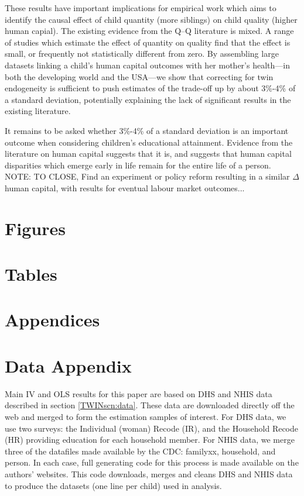 \documentclass[subeqn]{article}
\begin{document}
\begin{spacing}{1.4}
These results have important implications for empirical work which aims to 
identify the causal effect of child quantity (more siblings) on child quality
(higher human capial).  The existing evidence from the Q--Q literature is 
mixed.  A range of studies which estimate the effect of quantity on quality
find that the effect is small, or frequently not statistically different from
zero.  By assembling large datasets linking a child's human capital outcomes
with her mother's health---in both the developing world and the USA---we show
that correcting for twin endogeneity is sufficient to push estimates of the
trade-off up by about 3\%-4\% of a standard deviation, potentially explaining 
the lack of significant results in the existing literature.

It remains to be asked whether 3\%-4\% of a standard deviation is an 
important outcome when considering children's educational attainment. Evidence 
from the literature on human capital suggests that it is, and suggests that 
human capital disparities which emerge early in life remain for the entire
life of a person.  NOTE: TO CLOSE, Find an experiment or policy reform 
resulting in a similar $\Delta$ human capital, with results for eventual
labour market outcomes...


\newpage
\section*{Figures}


\clearpage
\section*{Tables}

\clearpage




\newpage
\appendix
\section*{Appendices}
\section{Data Appendix}
\label{TWINscn:dataApp}
Main IV and OLS results for this paper are based on DHS and NHIS data described 
in section \ref{TWINscn:data}.  These data are downloaded directly off the web 
and merged to form the estimation samples of interest. For DHS data, we use two 
surveys: the Individual (woman) Recode (IR), and the Household Recode (HR) 
providing education for each household member.  For NHIS data, we merge three 
of the datafiles made available by the CDC: familyxx, household, and person.
In each case, full generating code for this process is made available on the
authors' websites.  This code downloads, merges and cleans DHS and NHIS data to
produce the datasets (one line per child) used in analysis.


\end{spacing}
\end{document}

